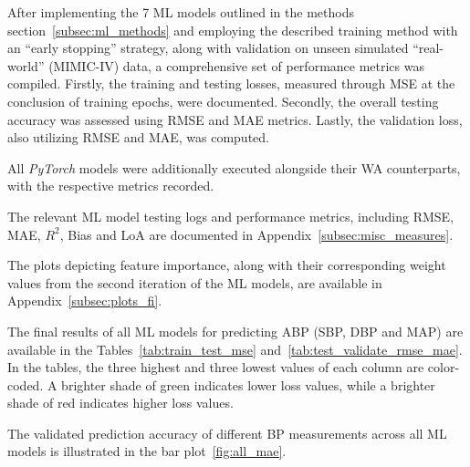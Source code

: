 After implementing the 7 ML models outlined in the methods section~\ref{subsec:ml_methods} and employing the described training method with an \enquote{early stopping} strategy,
along with validation on unseen simulated \enquote{real-world} (MIMIC-IV) data, a comprehensive set of performance metrics was compiled.
Firstly, the training and testing losses, measured through MSE at the conclusion of training epochs, were documented.
Secondly, the overall testing accuracy was assessed using RMSE and MAE metrics.
Lastly, the validation loss, also utilizing RMSE and MAE, was computed.

All \textit{PyTorch} models were additionally executed alongside their \ac{WA} counterparts, with the respective metrics recorded.

The relevant ML model testing logs and performance metrics, including RMSE, MAE, \textit{$R^2$}, Bias and LoA are documented in Appendix~\ref{subsec:misc_measures}.

The plots depicting feature importance, along with their corresponding weight values from the second iteration of the ML models, are available in Appendix~\ref{subsec:plots_fi}.

The final results of all ML models for predicting ABP (SBP, DBP and MAP) are available in the Tables~\ref{tab:train_test_mse} and~\ref{tab:test_validate_rmse_mae}.
In the tables, the three highest and three lowest values of each column are color-coded.
A brighter shade of green indicates lower loss values, while a brighter shade of red indicates higher loss values.

The validated prediction accuracy of different BP measurements across all ML models is illustrated in the bar plot~\ref{fig:all_mae}.

